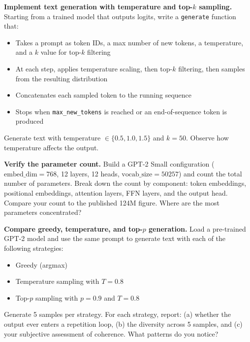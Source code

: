 \begin{problem}[2]
  \textbf{Implement text generation with temperature and top-$k$ sampling.}
  Starting from a trained model that outputs logits, write a
  \texttt{generate} function that:
  \begin{itemize}
    \item Takes a prompt as token IDs, a max number of new tokens, a
          temperature, and a $k$ value for top-$k$ filtering
    \item At each step, applies temperature scaling, then top-$k$
          filtering, then samples from the resulting distribution
    \item Concatenates each sampled token to the running sequence
    \item Stops when \texttt{max\_new\_tokens} is reached or an end-of-sequence
          token is produced
  \end{itemize}
  Generate text with temperature $\in \{0.5, 1.0, 1.5\}$ and $k = 50$.
  Observe how temperature affects the output.
\end{problem}

\begin{problem}[3]
  \textbf{Verify the parameter count.} Build a GPT-2 Small configuration
  ($\text{embed\_dim} = 768$, 12 layers, 12 heads, $\text{vocab\_size} = 50257$)
  and count the total number of parameters. Break down the count by component:
  token embeddings, positional embeddings, attention layers, FFN layers, and
  the output head. Compare your count to the published 124M figure. Where are
  the most parameters concentrated?
\end{problem}

\begin{problem}[4]
  \textbf{Compare greedy, temperature, and top-$p$ generation.} Load a
  pre-trained GPT-2 model and use the same prompt to generate text with each
  of the following strategies:
  \begin{itemize}
    \item Greedy (argmax)
    \item Temperature sampling with $T = 0.8$
    \item Top-$p$ sampling with $p = 0.9$ and $T = 0.8$
  \end{itemize}
  Generate 5 samples per strategy. For each strategy, report: (a) whether the
  output ever enters a repetition loop, (b) the diversity across 5 samples, and
  (c) your subjective assessment of coherence. What patterns do you notice?
\end{problem}

